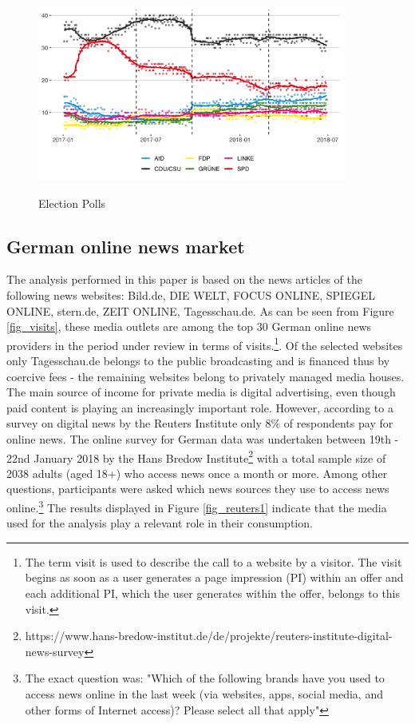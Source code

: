 \documentclass[12pt,a4paper,notitlepage]{article}
\begin{document}
\begin{figure}[H]
\begin{center}
	\caption{Election Polls}
	\includegraphics[width=0.9\textwidth]{../figs/polldata}
	\label{fig_polls}
	\end{center}
\end{figure}

\subsection{German online news market}

The analysis performed in this paper is based on the news articles of the following news websites: Bild.de, DIE WELT, FOCUS ONLINE, SPIEGEL ONLINE, stern.de, ZEIT ONLINE, Tagesschau.de. As can be seen from  Figure \ref{fig_visits}, these media outlets are among the top 30 German online news providers in the period under review in terms of visits.\footnote{The term visit is used to describe the call to a website by a visitor. The visit begins as soon as a user generates a page impression (PI) within an offer and each additional PI, which the user generates within the offer, belongs to this visit.}. Of the selected websites only Tagesschau.de belongs to the public broadcasting and is financed thus by coercive fees - the remaining websites belong to privately managed media houses. The main source of income for private media is digital advertising, even though paid content is playing an increasingly important role. However, according to a survey on digital news by the Reuters Institute \citep{newman_reuters_2018} only 8\% of respondents pay for online news. The online survey for German data was undertaken between 19th - 22nd January 2018 by the Hans Bredow Institute\footnote{https://www.hans-bredow-institut.de/de/projekte/reuters-institute-digital-news-survey} with a total sample size of 2038 adults (aged 18+) who access news once a month or more. Among other questions, participants were asked which news sources they use to access news online.\footnote{The exact question was: "Which of the following brands have you used to access news online in the last week (via websites, apps, social media, and other forms of Internet access)? Please select all that apply"} The results displayed in Figure \ref{fig_reuters1} indicate that the media used for the analysis play a relevant role in their consumption.
\end{document}
